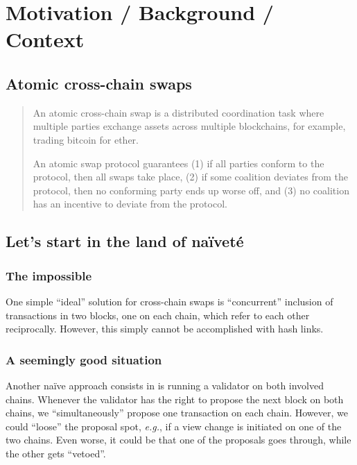 \documentclass{article}
\theoremstyle{definition}
\newcommand{\eg}[1][]{\emph{e.g.}, }
\begin{document}
\section{Motivation / Background / Context}

\subsection{Atomic cross-chain swaps}
\label{sec:atom-trans-across}

\begin{quote}
  An atomic cross-chain swap is 
  a distributed coordination task 
  where multiple parties exchange assets across multiple blockchains, 
  for example, trading bitcoin for ether.

  An atomic swap protocol guarantees 
  (1) if all parties conform to the protocol, 
  then all swaps take place, 
  (2) if some coalition deviates from the protocol, 
  then no conforming party ends up worse off, and 
  (3) no coalition has an incentive to deviate from the protocol.
\hfill\cite{podc18Herlihy} 
\end{quote}

\subsection{Let's start in the land of naïveté}
\label{sec:naivities}

\subsubsection{The impossible}
\label{sec:impossible-concurrency}

One simple ``ideal'' solution for cross-chain swaps is 
``concurrent''  inclusion of 
transactions in two blocks, one on each chain, 
which refer to each other reciprocally.
However, 
this simply cannot be accomplished with hash links.

\subsubsection{A seemingly good situation}
\label{sec:almost-safe}

Another naïve approach consists in
is running a validator on both involved chains. 
Whenever the validator has the right to propose 
the next block on both chains,
we “simultaneously” propose one transaction on each chain. 
However,
we could “loose” the proposal spot,
\eg if a view change is initiated on one of the two chains.
Even worse,
it could be that one of the proposals goes through,
while the other gets “vetoed”.
\end{document}
